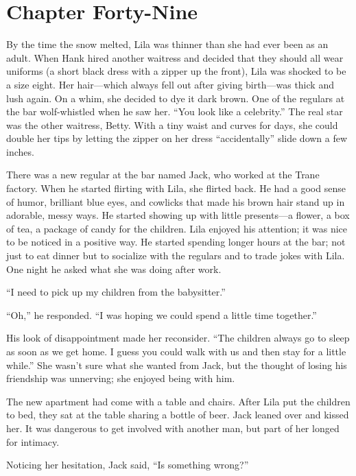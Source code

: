 \documentclass[
  letterpaper,
]{book}
\begin{document}

\chapter{Chapter Forty-Nine}\label{chapter-forty-nine}

By the time the snow melted, Lila was thinner than she had ever been as
an adult. When Hank hired another waitress and decided that they should
all wear uniforms (a short black dress with a zipper up the front), Lila
was shocked to be a size eight. Her hair---which always fell out after
giving birth---was thick and lush again. On a whim, she decided to dye
it dark brown. One of the regulars at the bar wolf-whistled when he saw
her. ``You look like a celebrity.'' The real star was the other
waitress, Betty. With a tiny waist and curves for days, she could double
her tips by letting the zipper on her dress ``accidentally'' slide down
a few inches.

There was a new regular at the bar named Jack, who worked at the Trane
factory. When he started flirting with Lila, she flirted back. He had a
good sense of humor, brilliant blue eyes, and cowlicks that made his
brown hair stand up in adorable, messy ways. He started showing up with
little presents---a flower, a box of tea, a package of candy for the
children. Lila enjoyed his attention; it was nice to be noticed in a
positive way. He started spending longer hours at the bar; not just to
eat dinner but to socialize with the regulars and to trade jokes with
Lila. One night he asked what she was doing after work.

``I need to pick up my children from the babysitter.''

``Oh,'' he responded. ``I was hoping we could spend a little time
together.''

His look of disappointment made her reconsider. ``The children always go
to sleep as soon as we get home. I guess you could walk with us and then
stay for a little while.'' She wasn't sure what she wanted from Jack,
but the thought of losing his friendship was unnerving; she enjoyed
being with him.

The new apartment had come with a table and chairs. After Lila put the
children to bed, they sat at the table sharing a bottle of beer. Jack
leaned over and kissed her. It was dangerous to get involved with
another man, but part of her longed for intimacy.

Noticing her hesitation, Jack said, ``Is something wrong?''
\end{document}
